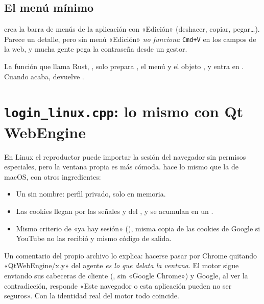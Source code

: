 \subsection{El menú mínimo}

 crea la barra de menús de la aplicación con «Edición» (deshacer, copiar,
pegar\dots). Parece un detalle, pero sin menú «Edición» \emph{no funciona} \texttt{Cmd+V} en los campos de la web, y mucha gente pega la contraseña desde un gestor.

La función que llama Rust, , solo prepara , el menú
y el objeto , y entra en . Cuando acaba, devuelve .

\section{\texttt{login\_linux.cpp}: lo mismo con Qt WebEngine}

En Linux el reproductor puede importar la sesión del navegador sin permisos especiales, pero
la ventana propia es más cómoda.  hace lo mismo que la de
macOS, con otros ingredientes:

\begin{itemize}
  \item Un  sin nombre: perfil privado, solo en memoria.
  \item Las cookies llegan por las señales  y  del
  , y se acumulan en un .
  \item Mismo criterio de «ya hay sesión» (), misma copia de las cookies
  de Google si YouTube no las recibió y mismo código de salida.
\end{itemize}

\begin{porque}
Un comentario del propio archivo lo explica: hacerse pasar por Chrome quitando
«QtWebEngine/x.y» del agente \emph{es lo que delata la ventana}. El motor sigue enviando sus
cabeceras de cliente (, sin «Google Chrome») y Google, al ver la
contradicción, responde «Este navegador o esta aplicación pueden no ser seguros». Con la
identidad real del motor todo coincide.
\end{porque}

